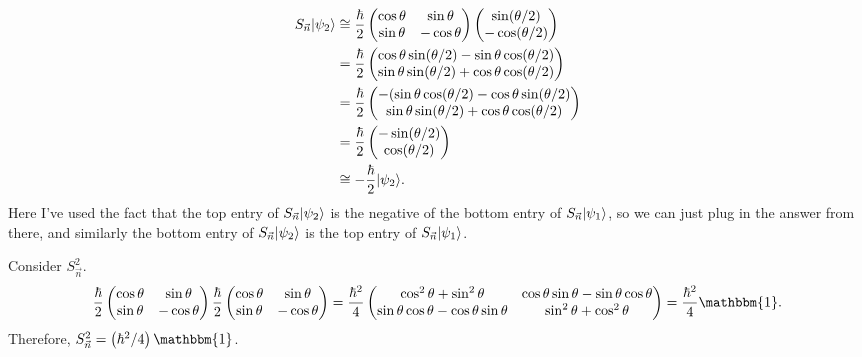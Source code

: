 \documentclass[11pt, letterpaper]{article}
\begin{document}
\begin{align*}
	S_{\vec{n} } \lvert\psi _2\rangle &\cong \frac{\hbar}{2}\begin{pmatrix}
	\cos \theta  & \sin \theta  \\
	\sin \theta  & -\cos \theta 
	\end{pmatrix}\begin{pmatrix}
	\sin (\theta  /2) \\
	-\cos (\theta /2)
	\end{pmatrix}\\
				   &=\frac{\hbar}{2}\begin{pmatrix}
				   \cos \theta \sin (\theta /2)-\sin \theta \cos (\theta /2) \\
				   \sin \theta \sin (\theta /2)+\cos \theta \cos (\theta /2)
				   \end{pmatrix}\\
				   &=\frac{\hbar}{2}\begin{pmatrix}
				   -(\sin \theta \cos (\theta /2)-\cos \theta \sin (\theta /2) \\
				   \sin \theta \sin (\theta /2)+\cos \theta \cos (\theta /2)
				   \end{pmatrix}\\
				   &=\frac{\hbar}{2}\begin{pmatrix}
				   -\sin (\theta /2) \\
				   \cos (\theta /2)
				   \end{pmatrix}\\
				   &\cong -\frac{\hbar}{2}\lvert\psi _2\rangle 
.\end{align*}
Here I've used the fact that the top entry of $S_{\vec{n} } \lvert\psi_2\rangle  $ is the negative of the bottom entry of $S_{\vec{n} } \lvert\psi _1\rangle $, so we can just plug in the answer from there, and similarly the bottom entry of $S_{\vec{n} } \lvert\psi _2\rangle $ is the top entry of $S_{\vec{n} } \lvert\psi _1\rangle $.

Consider $S_{\vec{n} }^2$.
\[
	\frac{\hbar}{2} \begin{pmatrix}
	\cos \theta  & \sin \theta  \\
	\sin \theta  & -\cos \theta 
	\end{pmatrix}\frac{\hbar}{2}\begin{pmatrix}
	\cos \theta  & \sin \theta  \\
	\sin \theta  & -\cos \theta 
	\end{pmatrix}=\frac{\hbar^2}{4}\begin{pmatrix}
	\cos ^2\theta +\sin ^2\theta  & \cos \theta \sin \theta -\sin \theta \cos \theta  \\
	\sin \theta \cos \theta -\cos \theta \sin \theta  & \sin ^2\theta +\cos ^2\theta 
	\end{pmatrix}= \frac{\hbar^2}{4} \mathbbm{1}
.\]
Therefore, $S_{\vec{n} }^2=\left(  \hbar^2/4 \right) \mathbbm{1}  $.
\end{document}
